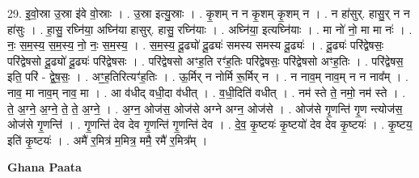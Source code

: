 \documentclass[17pt]{extarticle}
\begin{document}
29. इ॒वो॒स्रा उ॒स्रा इ॑वे वो॒स्राः । . उ॒स्रा इत्यु॒स्राः । . कृ॒शम् न न कृ॒शम् कृ॒शम् न । . न हा॑सुर्. हासु॒र् न न हा॑सुः । . हा॒सु॒ रघ्नि॑या॒ अघ्नि॑या हासुर्. हासु॒ रघ्नि॑याः । . अघ्नि॑या॒ इत्यघ्नि॑याः । . मा नो॑ नो॒ मा मा नः॑ । . नः॒ स॒म॒स्य॒ स॒म॒स्य॒ नो॒ नः॒ स॒म॒स्य॒ । . स॒म॒स्य॒ दू॒ढ्यो॑ दू॒ढ्यः॑ समस्य समस्य दू॒ढ्यः॑ । . दू॒ढ्यः॑ परि॑द्वेषसः॒ परि॑द्वेषसो दू॒ढ्यो॑ दू॒ढ्यः॑ परि॑द्वेषसः । . परि॑द्वेषसो अꣳह॒ति रꣳ॑ह॒तिः परि॑द्वेषसः॒ परि॑द्वेषसो अꣳह॒तिः । . परि॑द्वेषस॒ इति॒ परि॑ - द्वे॒ष॒सः॒ । . अꣳ॒॒ह॒तिरित्यꣳ॑ह॒तिः । . ऊ॒र्मिर् न नोर्मि रू॒र्मिर् न । . न नाव॒म् नाव॒म् न न नाव᳚म् । . नाव॒ मा नाव॒म् नाव॒ मा । . आ व॑धीद् वधी॒दा व॑धीत् । . व॒धी॒दिति॑ वधीत् । . नम॑ स्ते ते॒ नमो॒ नम॑ स्ते । . ते॒ अ॒ग्ने॒ अ॒ग्ने॒ ते॒ ते॒ अ॒ग्ने॒ । . अ॒ग्न॒ ओज॑स॒ ओज॑से अग्ने अग्न॒ ओज॑से । . ओज॑से गृ॒णन्ति॑ गृ॒ण न्त्योज॑स॒ ओज॑से गृ॒णन्ति॑ । . गृ॒णन्ति॑ देव देव गृ॒णन्ति॑ गृ॒णन्ति॑ देव । . दे॒व॒ कृ॒ष्टयः॑ कृ॒ष्टयो॑ देव देव कृ॒ष्टयः॑ । . कृ॒ष्टय॒ इति॑ कृ॒ष्टयः॑ । . अमै॑ र॒मित्र॑ म॒मित्र॒ ममै॒ रमै॑ र॒मित्र᳚म् । \newline

\textbf{Ghana Paata } \newline
\end{document}
